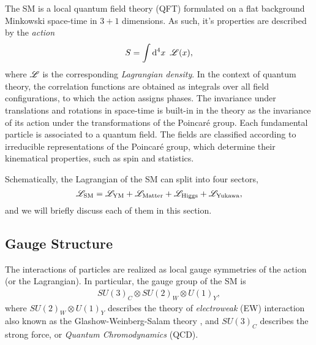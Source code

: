 The SM is a local quantum field theory (QFT) formulated on a flat background Minkowski space-time in $3+1$ dimensions.
As such, it's properties are described by the \emph{action}
\[
  S = \int \dd[4]{x}~{\mathscr{L}}(x),
\]
where ${\mathscr{L}}$ is the corresponding \emph{Lagrangian density}. 
In the context of quantum theory, the correlation functions
are obtained as integrals over all field configurations, to which the action assigns phases.
The invariance under translations and rotations in space-time is built-in in the theory as the
invariance of its action under the transformations of the Poincaré group.
Each fundamental particle is associated to a quantum field.
The fields are classified according to irreducible representations of the Poincaré group,
which determine their kinematical properties, such as spin and statistics.


Schematically, the Lagrangian of the SM can split into four sectors,
\begin{equation}
  {\mathscr{L}}_{\text{SM}} = {\mathscr{L}}_{\text{YM}} + {\mathscr{L}}_{\text{Matter}} + {\mathscr{L}}_{\text{Higgs}} + {\mathscr{L}}_{\text{Yukawa}},
\end{equation}
and we will briefly discuss each of them in this section.

\subsection{Gauge Structure}
\label{sec:giym}

The interactions of particles are realized as local gauge symmetries of the action (or the Lagrangian).
In particular, the gauge group of the SM is
\begin{align}\label{eq:SMgauge}
  SU(3)_C\otimes SU(2)_W \otimes U(1)_Y,
\end{align}
where $SU(2)_W \otimes U(1)_Y$ describes the theory of \emph{electroweak} (EW)
interaction also known as the Glashow-Weinberg-Salam theory \cite{Glashow1961a,Weinberg1967a,Salam1968,Glashow1970},
and $SU(3)_C$ describes the strong force, or \emph{Quantum Chromodynamics} (QCD).

